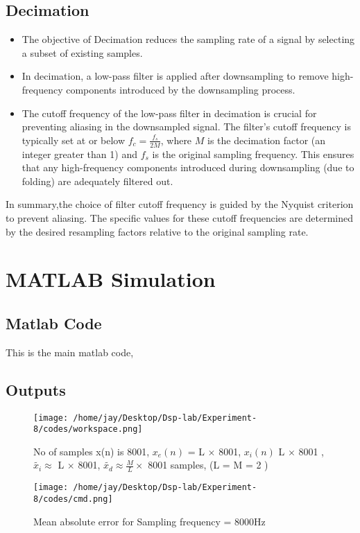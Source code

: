 \documentclass[journal,12pt,onecolumn]{IEEEtran}
\theoremstyle{remark}
\begin{document}
\subsection{Decimation}
\begin{itemize}
    \item The objective of Decimation reduces the sampling rate of a signal by selecting a subset of existing samples.
    \item In decimation, a low-pass filter is applied after downsampling to remove high-frequency components introduced by the downsampling process.
    \item The cutoff frequency of the low-pass filter in decimation is crucial for preventing aliasing in the downsampled signal. The filter's cutoff frequency is typically set at or below \(f_c =  \frac{f_s}{2M} \), where \( M \) is the decimation factor (an integer greater than 1) and \( f_s \) is the original sampling frequency. This ensures that any high-frequency components introduced during downsampling (due to folding) are adequately filtered out.
\end{itemize}

In summary,the choice of filter cutoff frequency is guided by the Nyquist criterion to prevent aliasing. The specific values for these cutoff frequencies are determined by the desired resampling factors relative to the original sampling rate.
\section{MATLAB Simulation}
\subsection{Matlab Code}
This is the main matlab code,

\subsection{Outputs}

\begin{figure}[ht] %
  \centering
  \texttt{[image: /home/jay/Desktop/Dsp-lab/Experiment-8/codes/workspace.png]}
  \caption{No of samples x(n) is 8001, $x_e(n)$ = L $\times$ 8001, $x_i(n)$  L $\times$ 8001 , $\widetilde{x_i} \approx$ L $\times$ 8001, $\widetilde{x_d} \approx \frac{M}{L} \times$ 8001 samples, (L = M = 2 )}
\end{figure}
\begin{figure}[ht] %
  \centering
  \texttt{[image: /home/jay/Desktop/Dsp-lab/Experiment-8/codes/cmd.png]}
  \caption{Mean absolute error for Sampling frequency = 8000Hz}
\end{figure}
\clearpage
\end{document}

